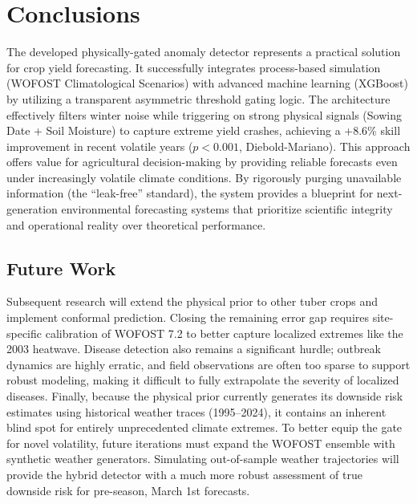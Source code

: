 \clearpage
\section{Conclusions}

The developed physically-gated anomaly detector represents a practical solution for crop yield forecasting. It successfully integrates process-based simulation (WOFOST Climatological Scenarios) with advanced machine learning (XGBoost) by utilizing a transparent asymmetric threshold gating logic. The architecture effectively filters winter noise while triggering on strong physical signals (Sowing Date + Soil Moisture) to capture extreme yield crashes, achieving a +8.6\% skill improvement in recent volatile years ($p < 0.001$, Diebold-Mariano). This approach offers value for agricultural decision-making by providing reliable forecasts even under increasingly volatile climate conditions. By rigorously purging unavailable information (the ``leak-free'' standard), the system provides a blueprint for next-generation environmental forecasting systems that prioritize scientific integrity and operational reality over theoretical performance.

\subsection{Future Work}
Subsequent research will extend the physical prior to other tuber crops and implement conformal prediction. Closing the remaining error gap requires site-specific calibration of WOFOST 7.2 to better capture localized extremes like the 2003 heatwave. Disease detection also remains a significant hurdle; outbreak dynamics are highly erratic, and field observations are often too sparse to support robust modeling, making it difficult to fully extrapolate the severity of localized diseases. Finally, because the physical prior currently generates its downside risk estimates using historical weather traces (1995–2024), it contains an inherent blind spot for entirely unprecedented climate extremes. To better equip the gate for novel volatility, future iterations must expand the WOFOST ensemble with synthetic weather generators. Simulating out-of-sample weather trajectories will provide the hybrid detector with a much more robust assessment of true downside risk for pre-season, March 1st forecasts.